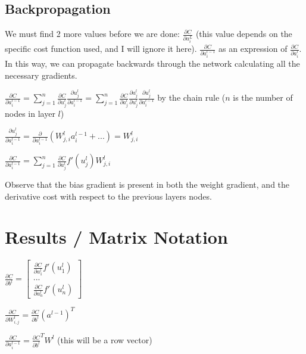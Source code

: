 \documentclass[14pt]{extarticle}
\begin{document}
\subsection{Backpropagation}
\begin{flushleft}

We must find 2 more values before we are done: $\frac{\partial C}{\partial a^L_i}$ (this value depends on the specific cost function used, and I will ignore it here). $\frac{\partial C}{\partial a^{l-1}_i}$ as an expression of  $\frac{\partial C}{\partial a^l_i}$. In this way, we can propagate backwards through the network calculating all the necessary gradients.

$\frac{\partial C}{\partial a^{l-1}_i}=\sum_{j=1}^n\frac{\partial C}{\partial u^l_j}\frac{\partial u^l_j}{\partial a^{l-1}_i}=\sum_{j=1}^n\frac{\partial C}{\partial a^l_j}\frac{\partial a^l_j}{\partial u^l_j}\frac{\partial u^l_j}{\partial a^{l-1}_i}$ by the chain rule ($n$ is the number of nodes in layer $l$)

$\frac{\partial u^l_j}{\partial a^{l-1}_i}=\frac{\partial}{\partial a^{l-1}_i}(W^l_{j,i}a^{l-1}_i+...)=W^l_{j,i}$

$\frac{\partial C}{\partial a^{l-1}_i}=\sum_{j=1}^n\frac{\partial C}{\partial a^l_j}f'(u^l_j)W^l_{j,i}$

Observe that the bias gradient is present in both the weight gradient, and the derivative cost with respect to the previous layers nodes.
    
\end{flushleft}
\pagebreak
\section{Results / Matrix Notation}
\begin{flushleft}
$\frac{\partial C}{\partial b^l}=\begin{bmatrix}
    \frac{\partial C}{\partial a^l_1}f'(u^l_1) \\
    ...\\
    \frac{\partial C}{\partial a^l_n}f'(u^l_n)
\end{bmatrix}$

$\frac{\partial C}{\partial W^l_{i,j}}=\frac{\partial C}{\partial b^l}(a^{l-1})^T$

$\frac{\partial C}{\partial a^{l-1}_i}=\frac{\partial C}{\partial b^l}^TW^l$ (this will be a row vector)
\end{flushleft}
\end{document}

